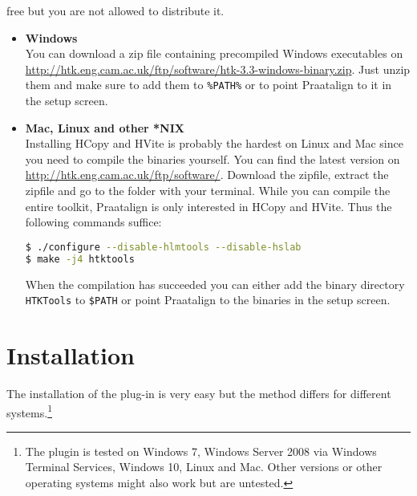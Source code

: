 \begin{itemize}
		free but you are not allowed to distribute it.
		\begin{itemize}
			\item \textbf{Windows}\\
				You can download a zip file containing precompiled Windows executables
				on \url{http://htk.eng.cam.ac.uk/ftp/software/htk-3.3-windows-binary.zip}.
				Just unzip them and make sure to add them to \texttt{\%PATH\%} or to
				point Praatalign to it in the setup screen.
			\item \textbf{Mac, Linux and other *NIX}\\
				Installing HCopy and HVite is probably the hardest on Linux and Mac
				since you need to compile the binaries yourself. You can find the
				latest version on \url{http://htk.eng.cam.ac.uk/ftp/software/}.
				Download the zipfile, extract the zipfile and go to the folder with
				your terminal. While you can compile the entire toolkit, Praatalign is
				only interested in HCopy and HVite. Thus the following commands
				suffice:
				\begin{lstlisting}[language=bash]
$ ./configure --disable-hlmtools --disable-hslab
$ make -j4 htktools
				\end{lstlisting}
				When the compilation has succeeded you can either add the binary
				directory \texttt{HTKTools} to \texttt{\$PATH} or point Praatalign to
				the binaries in the setup screen.
		\end{itemize}
\end{itemize}

\section{Installation}\label{sec:installation}
The installation of the plug-in is very easy but the method differs for
different systems.\footnote{The plugin is tested on Windows 7, Windows Server
2008 via Windows Terminal Services, Windows 10, Linux and Mac. Other versions
or other operating systems might also work but are untested.}

